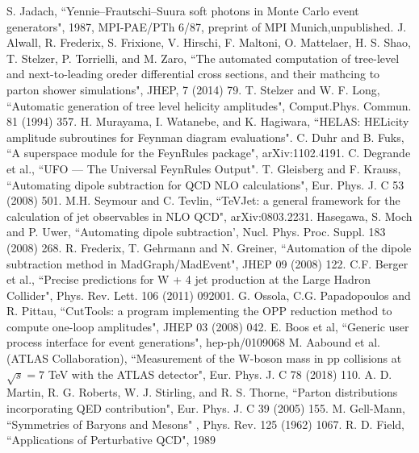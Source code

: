 \documentclass
[
]
{thesis}
\begin{document}
\begin{thebibliography}{widestlabel}
	  S. Jadach, ``Yennie–Frautschi–Suura  soft photons in Monte Carlo event generators", 1987, MPI-PAE/PTh 6/87, preprint of MPI Munich,unpublished.
	 J. Alwall, R. Frederix, S. Frixione, V. Hirschi, F. Maltoni, O. Mattelaer, H. S.
	Shao, T. Stelzer, P. Torrielli, and M. Zaro, ``The automated computation of tree-level and next-to-leading oreder differential cross sections, and their mathcing to parton shower simulations", JHEP, 7 (2014) 79. 
	 T. Stelzer and W. F. Long, ``Automatic generation of tree level helicity amplitudes", Comput.Phys. Commun. 81 (1994) 357.
	 H. Murayama, I. Watanebe, and K. Hagiwara, ``HELAS: HELicity amplitude subroutines for Feynman diagram evaluations". 
	 C. Duhr and B. Fuks, ``A superspace module for the FeynRules package", arXiv:1102.4191.
	 C. Degrande et al., ``UFO — The Universal FeynRules Output".
	 T. Gleisberg and F. Krauss, ``Automating dipole subtraction for QCD NLO calculations",
	Eur. Phys. J. C 53 (2008) 501.
	 M.H. Seymour and C. Tevlin, ``TeVJet: a general framework for the calculation of jet
	observables in NLO QCD", arXiv:0803.2231.
	 Hasegawa, S. Moch and P. Uwer, ``Automating dipole subtraction',
	Nucl. Phys. Proc. Suppl. 183 (2008) 268.
	 R. Frederix, T. Gehrmann and N. Greiner, ``Automation of the dipole subtraction method in
	MadGraph/MadEvent", JHEP 09 (2008) 122.
	 C.F. Berger et al., ``Precise predictions for W + 4 jet production at the Large Hadron Collider",
	Phys. Rev. Lett. 106 (2011) 092001.
	 G. Ossola, C.G. Papadopoulos and R. Pittau, ``CutTools: a program implementing the OPP
	reduction method to compute one-loop amplitudes", JHEP 03 (2008) 042.
	 E. Boos et al, ``Generic user process interface for event generations", hep-ph/0109068
	 M. Aabound et al. (ATLAS Collaboration), ``Measurement of the W-boson mass in pp collisions at $\sqrt{s}=7$ TeV with the ATLAS detector", Eur. Phys. J. C 78 (2018) 110.
	 A. D. Martin, R. G. Roberts, W. J. Stirling, and R. S. Thorne, ``Parton distributions incorporating QED contribution", Eur. Phys. J. C 39 (2005) 155.
	 M. Gell-Mann, ``Symmetries of Baryons and Mesons"
	, Phys. Rev. 125 (1962) 1067.
	 R. D. Field, ``Applications of Perturbative QCD", 1989 
\end{thebibliography}
\end{document}
